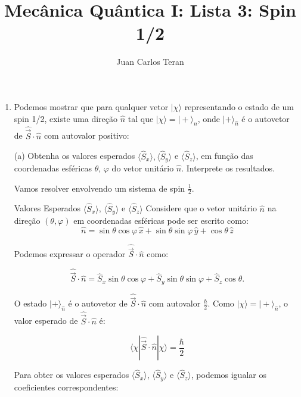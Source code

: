\documentclass[12pt]{article}
\begin{document}
\author{Juan Carlos Teran}
\title{Mecânica Quântica I: Lista 3: Spin 1/2}
\maketitle

\medskip

\begin{enumerate}

\item
Podemos mostrar que para qualquer vetor $| \chi \rangle$ representando o estado de um spin 1/2, existe uma direção  $\hat{n}$ tal que $| \chi \rangle = | + \rangle_{\hat{n}}$, onde $| + \rangle_{\hat{n}}$ é o autovetor de $\hat{\vec{S}} \cdot \hat{n}$ com autovalor positivo:

(a) Obtenha os valores esperados $\langle \hat{S}_x \rangle, \langle \hat{S}_y \rangle$ e $\langle \hat{S}_z \rangle$, em função das coordenadas esféricas $\theta$, $\varphi$ do vetor unitário $\hat{n}$. Interprete os resultados.

Vamos resolver envolvendo um sistema de spin \(\frac{1}{2}\).

Valores Esperados \(\langle \hat{S}_x \rangle\), \(\langle \hat{S}_y \rangle\) e \(\langle \hat{S}_z \rangle\) 
Considere que o vetor unitário \(\hat{n}\) na direção \((\theta, \varphi)\) em coordenadas esféricas pode ser escrito como:
\begin{equation}
    \hat{n} = \sin\theta \cos\varphi \, \hat{x} + \sin\theta \sin\varphi \, \hat{y} + \cos\theta \, \hat{z}
\end{equation}

Podemos expressar o operador \(\hat{\vec{S}} \cdot \hat{n}\) como:

\begin{equation}
  \hat{\vec{S}} \cdot \hat{n} = \hat{S}_x \sin\theta \cos\varphi + \hat{S}_y \sin\theta \sin\varphi + \hat{S}_z \cos\theta.  
\end{equation}

O estado \(|+\rangle_{\hat{n}}\) é o autovetor de \(\hat{\vec{S}} \cdot \hat{n}\) com autovalor \(\frac{\hbar}{2}\). Como \(|\chi\rangle = |+\rangle_{\hat{n}}\), o valor esperado de \(\hat{\vec{S}} \cdot \hat{n}\) é:

\begin{equation}
 \langle \chi | \hat{\vec{S}} \cdot \hat{n} | \chi \rangle = \frac{\hbar}{2}   
\end{equation}

Para obter os valores esperados \(\langle \hat{S}_x \rangle\), \(\langle \hat{S}_y \rangle\) e \(\langle \hat{S}_z \rangle\), podemos igualar os coeficientes correspondentes:


\end{enumerate}
\end{document}
